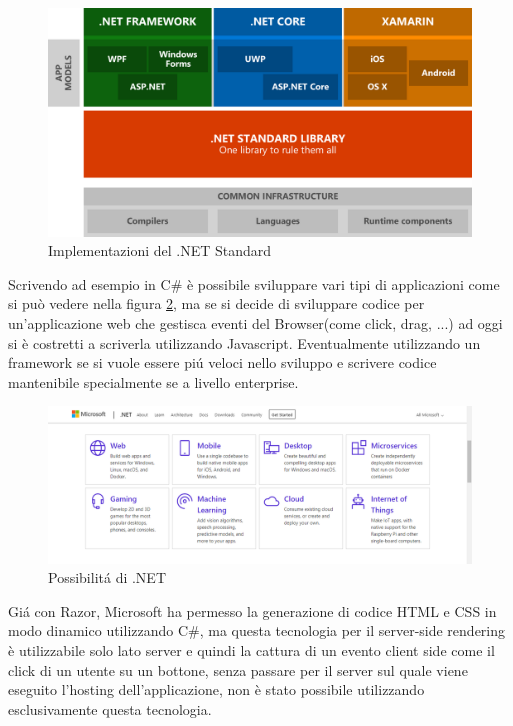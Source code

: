 \begin{figure}[H]
	\centerline{\includegraphics[scale=0.2]{figure/DotNetImplementations}}
	\caption{Implementazioni del .NET Standard}
	\label{fig:DotNetImplementations}
\end{figure}

Scrivendo ad esempio in C\# \`e possibile sviluppare vari tipi di applicazioni come si pu\`o vedere nella figura \ref{fig:DotNetCapabilities}, ma se si decide di sviluppare codice per un'applicazione web che gestisca eventi del Browser(come click, drag, ...) ad oggi si \`e costretti a scriverla utilizzando Javascript.
Eventualmente utilizzando un framework se si vuole essere pi\'u veloci nello sviluppo e scrivere codice mantenibile specialmente se a livello enterprise.

\begin{figure}[H]
\centerline{\includegraphics[scale=0.35]{figure/DotNetFrameworkCapabilities}}
\caption{Possibilit\'a di .NET}
\label{fig:DotNetCapabilities}
\end{figure}

Gi\'a con Razor\cite{razor}, Microsoft ha permesso la generazione di codice HTML e CSS in modo dinamico utilizzando C\#, ma questa tecnologia per il server-side rendering \`e utilizzabile solo lato server e quindi la cattura di un evento client side come il click di un utente su un bottone, senza passare per il server sul quale viene eseguito l'hosting dell'applicazione, non \`e stato possibile utilizzando esclusivamente questa tecnologia.

